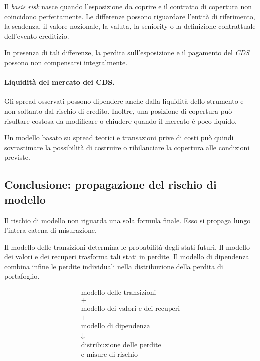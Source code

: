 Il \emph{basis risk} nasce quando l'esposizione da coprire e il
contratto di copertura non coincidono perfettamente. Le differenze
possono riguardare l'entit\`{a} di riferimento, la scadenza, il valore
nozionale, la valuta, la seniority o la definizione contrattuale
dell'evento creditizio.

In presenza di tali differenze, la perdita sull'esposizione e il
pagamento del \emph{CDS} possono non compensarsi integralmente.

\paragraph{Liquidit\`{a} del mercato dei CDS.}

Gli spread osservati possono dipendere anche dalla liquidit\`{a} dello
strumento e non soltanto dal rischio di credito. Inoltre, una posizione
di copertura pu\`{o} risultare costosa da modificare o chiudere quando
il mercato \`{e} poco liquido.

Un modello basato su spread teorici e transazioni prive di costi pu\`{o}
quindi sovrastimare la possibilit\`{a} di costruire o ribilanciare la
copertura alle condizioni previste.

\subsection{Conclusione: propagazione del rischio di modello}

\label{subsec:cap9-conclusione-rischio-modello}

Il rischio di modello non riguarda una sola formula finale. Esso si
propaga lungo l'intera catena di misurazione.

Il modello delle transizioni determina le probabilit\`{a} degli stati
futuri. Il modello dei valori e dei recuperi trasforma tali stati in
perdite. Il modello di dipendenza combina infine le perdite individuali
nella distribuzione della perdita di portafoglio.

\[
\boxed{
\begin{array}{c}
\text{modello delle transizioni}
\\[1mm]
+
\\[-1mm]
\text{modello dei valori e dei recuperi}
\\[1mm]
+
\\[-1mm]
\text{modello di dipendenza}
\\[2mm]
\downarrow
\\[2mm]
\text{distribuzione delle perdite}
\\
\text{e misure di rischio}
\end{array}
}
\]


